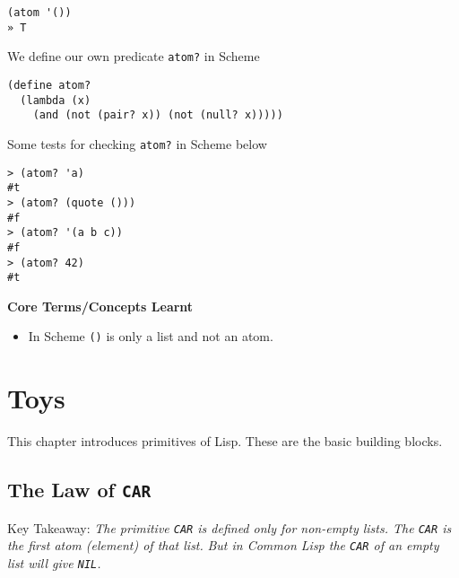 \documentclass[11pt]{article}
\begin{document}
\begin{itemize}
\begin{verbatim}
(atom '())
» T

\end{verbatim}

We define our own predicate \texttt{atom?} in Scheme 

\begin{verbatim}
(define atom?
  (lambda (x)
    (and (not (pair? x)) (not (null? x)))))

\end{verbatim}

Some tests for checking \texttt{atom?} in Scheme below

\begin{verbatim}
> (atom? 'a)
#t
> (atom? (quote ()))
#f
> (atom? '(a b c))
#f
> (atom? 42)
#t

\end{verbatim}
\end{itemize}


\textbf{Core Terms/Concepts Learnt}
\begin{itemize}
\item In Scheme \texttt{()} is only a list and not an atom.
\end{itemize}


\newpage
\section{Toys}
\label{sec:org70c2fc3}

This chapter introduces primitives of Lisp. These are the basic building blocks.

\vspace{1em}

\subsection{The Law of \texttt{CAR}}
\label{sec:org0da769e}
Key Takeaway:
\emph{The primitive \texttt{CAR} is defined only for non-empty lists. The \texttt{CAR} is the first atom (element) of that list.}
\emph{But in Common Lisp the \texttt{CAR} of an empty list will give \texttt{NIL}.}

\vspace{1em}
\end{document}
